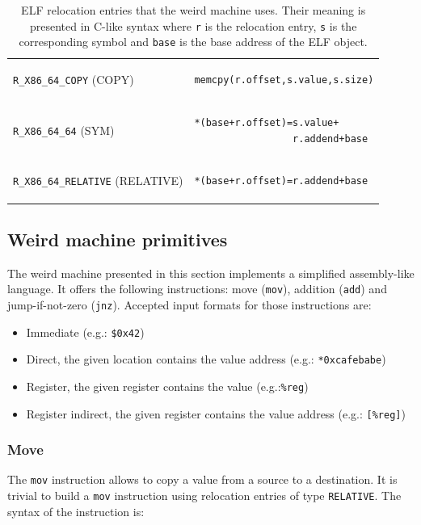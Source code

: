 \documentclass[11pt,twoside,a4paper]{article}
\begin{document}
\begin{table}
\centering
\begin{tabular}{ l | l }
  \hline
  \texttt{R\_X86\_64\_COPY} (COPY)
  &
\begin{lstlisting}
memcpy(r.offset,s.value,s.size)
\end{lstlisting} \\
  \texttt{R\_X86\_64\_64} (SYM) &
\begin{lstlisting}
*(base+r.offset)=s.value+
                 r.addend+base
\end{lstlisting} \\
  \texttt{R\_X86\_64\_RELATIVE} (RELATIVE) &
\begin{lstlisting}
*(base+r.offset)=r.addend+base
\end{lstlisting} \\
  \hline
\end{tabular}
  \captionsetup{width=13.5cm}
  \caption{ELF relocation entries that the weird machine uses. Their meaning is presented in C-like syntax where \texttt{r} is the relocation entry, \texttt{s} is the corresponding symbol and \texttt{base} is the base address of the ELF object.}
  \label{r_entries}
  \vspace{-0.4cm}
\end{table}


\subsection{Weird machine primitives}

The weird machine presented in this section implements a simplified assembly-like language. It offers the following instructions: move (\texttt{mov}), addition (\texttt{add}) and jump-if-not-zero (\texttt{jnz}). Accepted input formats for those instructions are:
\begin{itemize}
\item Immediate (e.g.: \texttt{\$0x42})
\item Direct, the given location contains the value address (e.g.: \texttt{*0xcafebabe})
\item Register, the given register contains the value (e.g.:\texttt{\%reg})
\item Register indirect, the given register contains the value address (e.g.: \texttt{[\%reg]})
\end{itemize}


\subsubsection{Move}
The \texttt{mov} instruction allows to copy a value from a source to a destination. It is trivial to build a \texttt{mov} instruction using relocation entries of type \texttt{RELATIVE}. The syntax of the instruction is:
\end{document}
